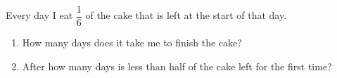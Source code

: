 Every day I eat $\dfrac16$ of the cake that is left at the start of that day.
\begin{enumerate}
\item[(a)] How many days does it take me to finish the cake?
\item[(b)] After how many days is less than half of the cake left for the first time?
\end{enumerate}
